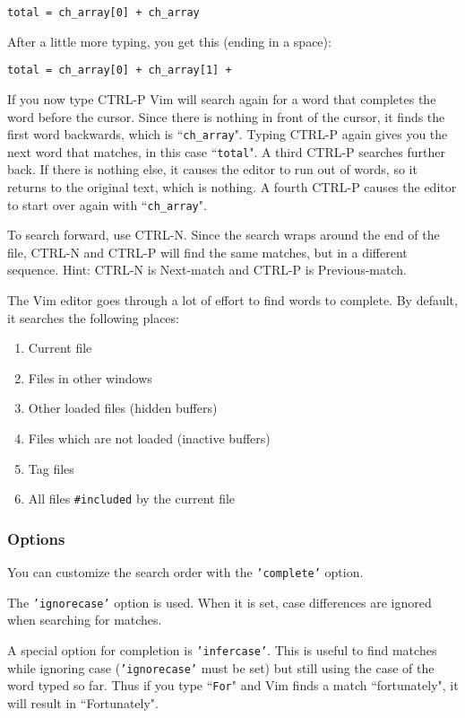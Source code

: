 \begin{Verbatim}[samepage=true]
    total = ch_array[0] + ch_array 
\end{Verbatim}

After a little more typing, you get this (ending in a space):

\begin{Verbatim}[samepage=true]
    total = ch_array[0] + ch_array[1] +  
\end{Verbatim}

If you now type CTRL-P Vim will search again for a word that completes the word before the cursor.
Since there is nothing in front of the cursor, it finds the first word backwards, which is ``\texttt{ch\_array}".
Typing CTRL-P again gives you the next word that matches, in this case ``\texttt{total}".
A third CTRL-P searches further back.
If there is nothing else, it causes the editor to run out of words, so it returns to the original text, which is nothing.
A fourth CTRL-P causes the editor to start over again with ``\texttt{ch\_array}".

To search forward, use CTRL-N.
Since the search wraps around the end of the file, CTRL-N and CTRL-P will find the same matches, but in a different sequence.
Hint: CTRL-N is Next-match and CTRL-P is Previous-match.

The Vim editor goes through a lot of effort to find words to complete.
By default, it searches the following places:
\begin{enumerate}
				\item Current file
				\item Files in other windows
				\item Other loaded files (hidden buffers)
				\item Files which are not loaded (inactive buffers)
				\item Tag files
				\item All files \texttt{\#included} by the current file
\end{enumerate}
\subsubsection{Options}
You can customize the search order with the \texttt{'complete'} option.

The \texttt{'ignorecase'} option is used.
When it is set, case differences are ignored when searching for matches.

A special option for completion is \texttt{'infercase'}.
This is useful to find matches while ignoring case (\texttt{'ignorecase'} must be set) but still using the case of the word typed so far.
Thus if you type ``\texttt{For}" and Vim finds a match ``fortunately", it will result in ``Fortunately".
